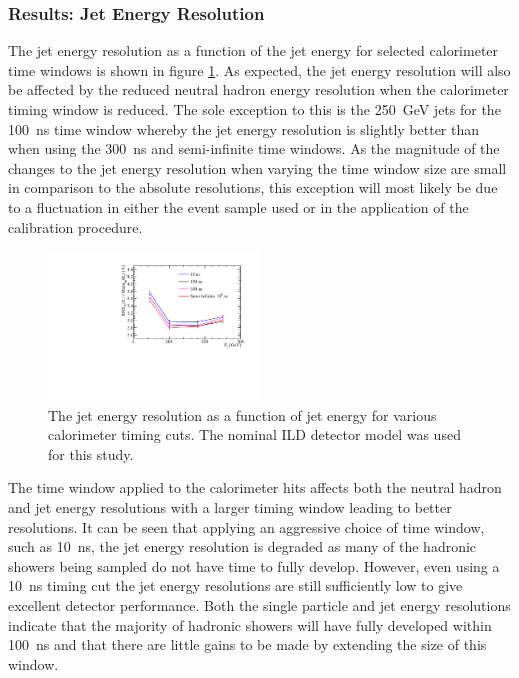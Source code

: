 
\subsubsection{Results: Jet Energy Resolution}
The jet energy resolution as a function of the jet energy for selected calorimeter time windows is shown in figure \ref{fig:jertimingcuts}.  As expected, the jet energy resolution will also be affected by the reduced neutral hadron energy resolution when the calorimeter timing window is reduced.  The sole exception to this is the 250~GeV jets for the 100~ns time window whereby the jet energy resolution is slightly better than when using the 300~ns and semi-infinite time windows.  As the magnitude of the changes to the jet energy resolution when varying the time window size are small in comparison to the absolute resolutions, this exception will most likely be due to a fluctuation in either the event sample used or in the application of the calibration procedure.  

\begin{figure}[h!]
\includegraphics[width=0.5\textwidth]{EnergyEstimators/Plots/TimingCuts/JER_vs_JetEnergy_TimingCutStudies.pdf}
\caption[The jet energy resolution as a function of jet energy for various calorimeter timing cuts.  The results shown use the nominal ILD detector model.]{The jet energy resolution as a function of jet energy for various calorimeter timing cuts.  The nominal ILD detector model was used for this study.}
\label{fig:jertimingcuts}
\end{figure}

The time window applied to the calorimeter hits affects both the neutral hadron and jet energy resolutions with a larger timing window leading to better resolutions.  It can be seen that applying an aggressive choice of time window, such as 10~ns, the jet energy resolution is degraded as many of the hadronic showers being sampled do not have time to fully develop.  However, even using a 10~ns timing cut the jet energy resolutions are still sufficiently low to give excellent detector performance.  Both the single particle and jet energy resolutions indicate that the majority of hadronic showers will have fully developed within 100~ns and that there are little gains to be made by extending the size of this window.  

